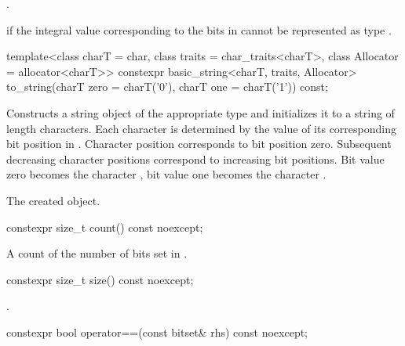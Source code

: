 \begin{itemdescr}
\pnum
\returns
{}.

\pnum
\throws
{}%
 if the integral value 
corresponding to the bits in 
cannot be represented as type .
\end{itemdescr}

%
\begin{itemdecl}
template<class charT = char,
         class traits = char_traits<charT>,
         class Allocator = allocator<charT>>
  constexpr basic_string<charT, traits, Allocator>
    to_string(charT zero = charT('0'), charT one = charT('1')) const;
\end{itemdecl}

\begin{itemdescr}
\pnum
\effects
Constructs a string object of the appropriate type
and initializes it to a string of length  characters.
Each character is determined by the value of its corresponding bit position in
.
Character position  corresponds to bit position zero.
Subsequent decreasing character positions correspond to increasing bit
positions.
Bit value zero becomes the character ,
bit value one becomes the character
.

\pnum
\returns
The created object.
\end{itemdescr}

%
\begin{itemdecl}
constexpr size_t count() const noexcept;
\end{itemdecl}

\begin{itemdescr}
\pnum
\returns
A count of the number of bits set in
.
\end{itemdescr}

%
\begin{itemdecl}
constexpr size_t size() const noexcept;
\end{itemdecl}

\begin{itemdescr}
\pnum
\returns
{}.
\end{itemdescr}

%
\begin{itemdecl}
constexpr bool operator==(const bitset& rhs) const noexcept;
\end{itemdecl}

